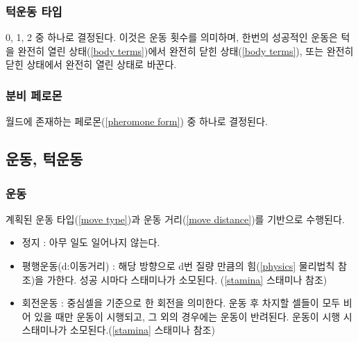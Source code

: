 \documentclass[a4paper,12pt]{article}
\begin{document}
\subsubsection{턱운동 타입}\label{jaw movement type}
0, 1, 2 중 하나로 결정된다. 이것은 운동 횟수를 의미하며,
한번의 성공적인 운동은 턱을 완전히 열린 상태(\ref{body terms})에서 완전히 닫힌 상태(\ref{body terms}), 또는 완전히 닫힌 상태에서 완전히 열린 상태로 바꾼다.
\subsubsection{분비 페로몬}\label{emitting pheromone}
월드에 존재하는 페로몬(\ref{pheromone form}) 중 하나로 결정된다.


\subsection{운동, 턱운동}\label{movement and jaw movement}
\subsubsection{운동}\label{movement}
계획된 운동 타입(\ref{move type})과 운동 거리(\ref{move distance})를 기반으로 수행된다.
\begin{itemize} 
\item 정지 : 아무 일도 일어나지 않는다. 
\item 평행운동(d:이동거리) : 해당 방향으로 d번 질량 만큼의 힘(\ref{physics} 물리법칙 참조)을 가한다. 성공 시마다 스태미나가 소모된다. (\ref{stamina} 스태미나 참조) 
\item 회전운동 : 중심셀을 기준으로 한 회전을 의미한다. 운동 후 차지할 셀들이 모두 비어 있을 때만 운동이 시행되고, 그 외의 경우에는 운동이 반려된다. 운동이 시행 시 스태미나가 소모된다.(\ref{stamina} 스태미나 참조) 
\end{itemize}
\end{document}
